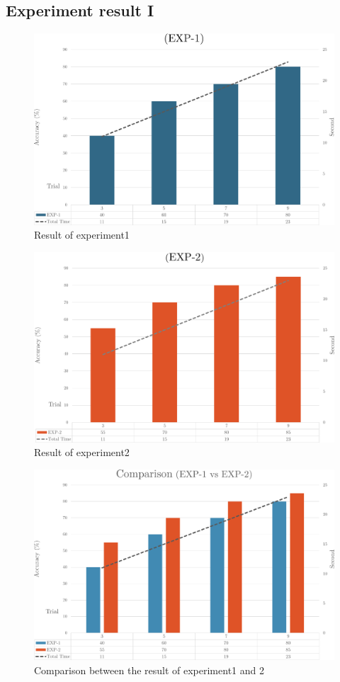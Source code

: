 \subsection{Experiment result I}
\begin{figure}[ht]
	\centering
	\includegraphics[width=\textwidth]{chapter7/result_1.pdf}
	\caption{Result of experiment1}
\end{figure}

\begin{figure}[ht]
	\centering
	\includegraphics[width=\textwidth]{chapter7/result_2.pdf}
	\caption{Result of experiment2}
\end{figure}

\begin{figure}[ht]
	\centering
	\includegraphics[width=\textwidth]{chapter7/result_12.pdf}
	\caption{Comparison between the result of experiment1 and 2}
\end{figure}

